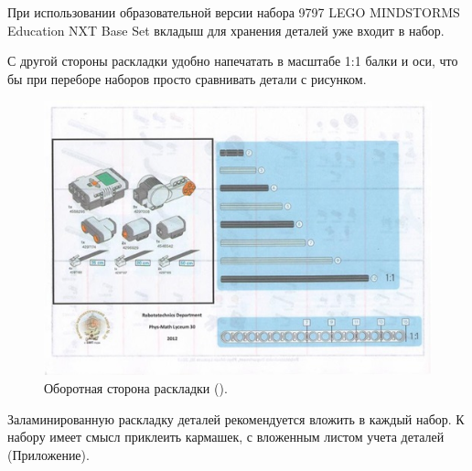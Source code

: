 При использовании образовательной версии набора 9797 LEGO MINDSTORMS Education NXT Base Set вкладыш для хранения деталей уже входит в набор.

С другой стороны раскладки удобно напечатать в масштабе 1:1 балки и оси, что бы при переборе наборов просто сравнивать детали с рисунком.
\clearpage
\begin{figure}[h!]
	\begin{center}
		\includegraphics[width=1\linewidth]{chapters/chapter2/images/3}
		\caption{Оборотная сторона раскладки ().}
		\label{ris:image2x3}
	\end{center}
\end{figure}		

Заламинированную раскладку деталей рекомендуется вложить в каждый набор. К набору имеет смысл приклеить кармашек, с вложенным листом учета деталей (Приложение).

